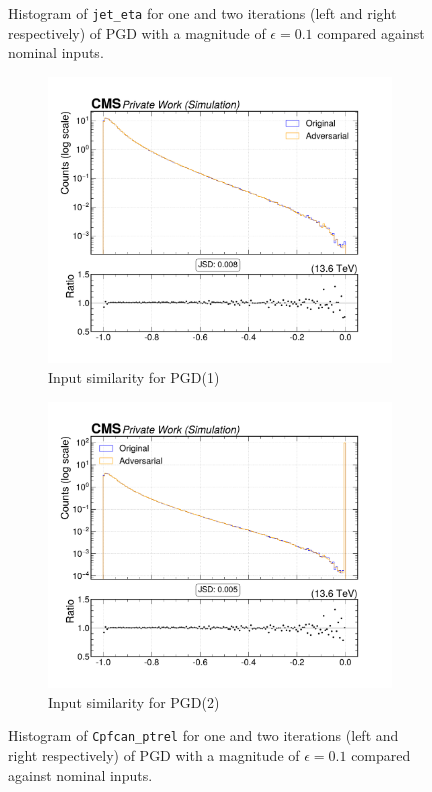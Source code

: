 \begin{figure}[htbp]
  \caption{Histogram of \texttt{jet\_eta} for one and two iterations (left and right respectively) of PGD with a magnitude of $\epsilon=0.1$ compared against nominal inputs.}
  \label{fig:hist_pgd_eta}
\end{figure}


\begin{figure}[htbp]
  \centering
  \begin{subfigure}[t]{0.5\textwidth}
    \includegraphics[width=\linewidth]{media/output/features/compare/pgd_1/cmp_cpf_arr_Cpfcan_ptrel.pdf}
    \caption{Input similarity for PGD(1)}
  \end{subfigure}\hfill
  \begin{subfigure}[t]{0.5\textwidth}
    \includegraphics[width=\linewidth]{media/output/features/compare/pgd_2/cmp_cpf_arr_Cpfcan_ptrel.pdf}
    \caption{Input similarity for PGD(2)}
  \end{subfigure}\hfill

  \caption{Histogram of \texttt{Cpfcan\_ptrel} for one and two iterations (left and right respectively) of PGD with a magnitude of $\epsilon=0.1$ compared against nominal inputs.}
  \label{fig:hist_pgd_cpf_ptrel}
\end{figure}

